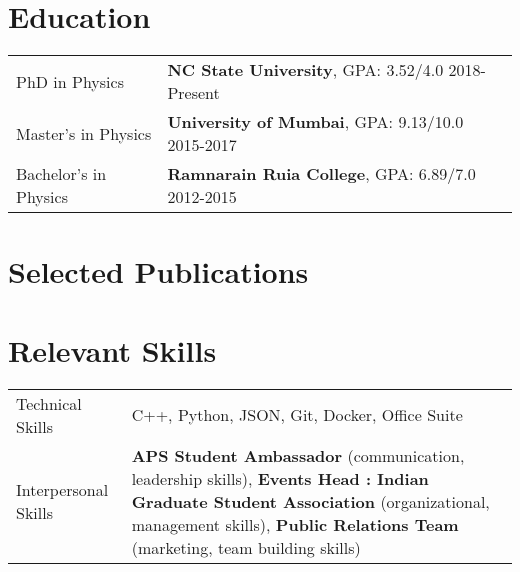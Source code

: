 \documentclass[a4paper,12pt]{article}
\begin{document}
\section{Education}
\begin{tabularx}{\linewidth}{@{}l X@{}}	
PhD in Physics & \textbf{NC State University}, GPA: 3.52/4.0 \hfill 2018-Present \\
Master's in Physics & \textbf{University of Mumbai}, GPA: 9.13/10.0 \hfill 2015-2017 \\ 
Bachelor's in Physics & \textbf{Ramnarain Ruia College}, GPA: 6.89/7.0 \hfill  2012-2015 \\

\end{tabularx}

\section{Selected Publications}
\begin{refsection}
\nocite{*}
\printbibliography[heading=none]
\end{refsection}

\section{Relevant Skills}
\begin{tabularx}{\linewidth}{@{}l X@{}}
Technical Skills &  \normalsize{C++, Python, JSON, Git, Docker, Office Suite}\\
Interpersonal Skills  &  \normalsize{\textbf{APS Student Ambassador} (communication, leadership skills), \newline \textbf{Events Head : Indian Graduate Student Association} (organizational, management skills), \textbf{Public Relations Team} (marketing, team building skills)}\\
\end{tabularx}

\vfill
\end{document}
